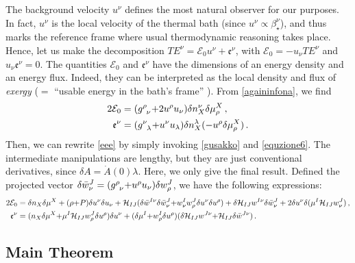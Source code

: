 \documentclass[a4paper, amsfonts, amssymb, amsmath, reprint, showkeys, nofootinbib, twoside,notitlepage,onecolumn]{revtex4-2}
\theoremstyle{definition}
\theoremstyle{theorem}
\theoremstyle{corollary}
\begin{document}
The background velocity $u^\nu$ defines the most natural observer for our purposes. In fact, $u^\nu$ is the local velocity of the thermal bath (since $u^\nu \propto \beta_\star^\nu$), and thus marks the reference frame where usual thermodynamic reasoning takes place. Hence, let us make the decomposition
$TE^\nu =\mathcal{E}_0 u^\nu +\mathfrak{e}^\nu$, with $\mathcal{E}_0=-u_\nu TE^\nu$ and $u_\nu\mathfrak{e}^\nu=0$. The quantities $\mathcal{E}_0$ and $\mathfrak{e}^\nu$ have the dimensions of an energy density and an energy flux. Indeed, they can be interpreted as the local density and flux of \textit{exergy} ($=$ ``usable energy in the bath's frame'' \cite{BecattiniExergy2023}). From \eqref{againinfona}, we find
\begin{equation}\label{eee}
\begin{split}
2\mathcal{E}_0={}&  (g\indices{^\rho _\nu}{+}2u^\rho u_\nu) \delta n_X^\nu \delta \mu^X_\rho \, ,\\
\mathfrak{e}^\nu ={}& (g\indices{^\nu _\lambda} {+} u^\nu u_\lambda)  \delta n_X^\lambda (-u^\rho \delta \mu^X_\rho) \, .\\
\end{split}
\end{equation}
Then, we can rewrite \eqref{eee} by simply invoking \eqref{gusakko} and \eqref{equzione6}. The intermediate manipulations are lengthy, but they are just conventional derivatives, since $\delta A=\dot{A}(0)\lambda$. Here, we only give the final result. Defined the projected vector
$\delta \Bar{w}^J_\nu =(g\indices{^\rho _\nu}{+}u^\rho u_\nu)\delta w^J_\rho$, we have the following expressions:
\begin{equation}\label{ammazzaoh}
\begin{split}
2\mathcal{E}_0={}&  \delta n_X \delta \mu^X +(\rho{+}P)\delta u^\nu \delta u_\nu +\mathcal{H}_{IJ}( \delta \Bar{w}^{I\nu}\delta\Bar{w}^J_\nu {+} w^I_\nu  w^J_\rho \delta u^\nu \delta u^\rho) +\delta \mathcal{H}_{IJ} w^{I\nu}\delta \Bar{w}^J_\nu +2 \delta u^\nu \delta (\mu^I \mathcal{H}_{IJ} w^J_\nu) \, ,\\
\mathfrak{e}^\nu ={}& (n_X \delta \mu^X {+}\mu^I \mathcal{H}_{IJ}w^J_\rho \delta u^\rho)\delta u^\nu +(\delta \mu^I {+}w^I_\rho \delta u^\rho)(\delta \mathcal{H}_{IJ} w^{J\nu}{+}\mathcal{H}_{IJ}\delta \Bar{w}^{J\nu}) \, .\\
\end{split}
\end{equation}


\subsection{Main Theorem}
\vspace{-0.2cm}
\end{document}
